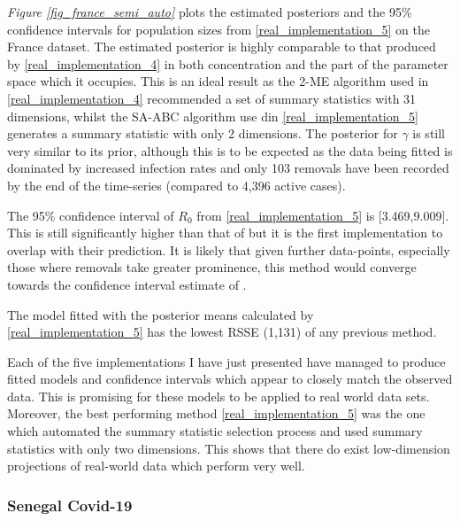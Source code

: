 \documentclass[11pt,a4paper]{article}
\theoremstyle{break}
\begin{document}
  \par \textit{Figure \ref{fig_france_semi_auto}} plots the estimated posteriors and the 95\% confidence intervals for population sizes from \ref{real_implementation_5} on the France dataset. The estimated posterior is highly comparable to that produced by \ref{real_implementation_4} in both concentration and the part of the parameter space which it occupies. This is an ideal result as the 2-ME algorithm used in \ref{real_implementation_4} recommended a set of summary statistics with 31 dimensions, whilst the SA-ABC algorithm use din \ref{real_implementation_5} generates a summary statistic with only 2 dimensions. The posterior for $\gamma$ is still very similar to its prior, although this is to be expected as the data being fitted is dominated by increased infection rates and only 103 removals have been recorded by the end of the time-series (compared to 4,396 active cases).

  \par The 95\% confidence interval of $R_0$ from \ref{real_implementation_5} is [3.469,9.009]. This is still significantly higher than that of \cite[]{estimated_r0_covid_19} but it is the first implementation to overlap with their prediction. It is likely that given further data-points, especially those where removals take greater prominence, this method would converge towards the confidence interval estimate of \cite[]{estimated_r0_covid_19}.

  \par The model fitted with the posterior means calculated by \ref{real_implementation_5} has the lowest RSSE (1,131) of any previous method.

  \par Each of the five implementations I have just presented have managed to produce fitted models and confidence intervals which appear to closely match the observed data. This is promising for these models to be applied to real world data sets. Moreover, the best performing method \ref{real_implementation_5} was the one which automated the summary statistic selection process and used summary statistics with only two dimensions. This shows that there do exist low-dimension projections of real-world data which perform very well.

\subsubsection{Senegal Covid-19}\label{sec_real_data_senegal}
\end{document}

